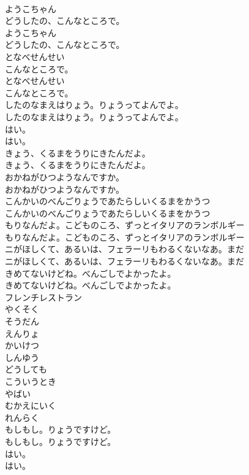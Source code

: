 \documentclass[8pt]{extreport}
\begin{document}
\begin{CJK}{UTF8}{min}
\\	ようこちゃん
\\	どうしたの、こんなところで。
\\	ようこちゃん
\\	どうしたの、こんなところで。
\\	となべせんせい
\\	こんなところで。
\\	となべせんせい
\\	こんなところで。
\\	したのなまえはりょう。りょうってよんでよ。
\\	したのなまえはりょう。りょうってよんでよ。
\\	はい。
\\	はい。
\\	きょう、くるまをうりにきたんだよ。
\\	きょう、くるまをうりにきたんだよ。
\\	おかねがひつようなんですか。
\\	おかねがひつようなんですか。
\\	こんかいのべんごりょうであたらしいくるまをかうつ
\\	こんかいのべんごりょうであたらしいくるまをかうつ
\\	もりなんだよ。こどものころ、ずっとイタリアのランボルギー
\\	もりなんだよ。こどものころ、ずっとイタリアのランボルギー
\\	ニがほしくて、あるいは、フェラーリもわるくないなあ。まだ
\\	ニがほしくて、あるいは、フェラーリもわるくないなあ。まだ
\\	きめてないけどね。べんごしでよかったよ。
\\	きめてないけどね。べんごしでよかったよ。
\\	フレンチレストラン
\\	やくそく
\\	そうだん
\\	えんりょ
\\	かいけつ
\\	しんゆう
\\	どうしても
\\	こういうとき
\\	やばい
\\	むかえにいく
\\	れんらく
\\	もしもし。りょうですけど。
\\	もしもし。りょうですけど。
\\	はい。
\\	はい。

\end{CJK}
\end{document}
